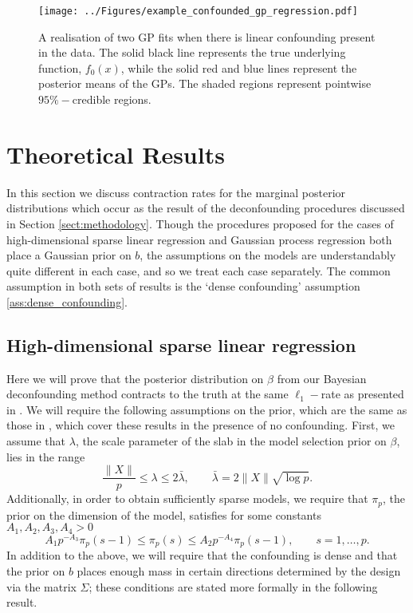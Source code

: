 \documentclass[11pt]{article}
\begin{document}
\begin{figure}[!h]
\centering
  \texttt{[image: ../Figures/example\_confounded\_gp\_regression.pdf]}\\
  \caption{A realisation of two GP fits when there is linear confounding present in the data. The solid black line represents the true underlying function, $f_0(x)$, while the solid red and blue lines represent the posterior means of the GPs. The shaded regions represent pointwise $95\%-$credible regions.}
\label{fig:gp_lin_confounding}
\end{figure}






\section{Theoretical Results}\label{sect:theory}
In this section we discuss contraction rates for the marginal posterior distributions which occur as the result of the deconfounding procedures discussed in Section \ref{sect:methodology}. Though the procedures proposed for the cases of high-dimensional sparse linear regression and Gaussian process regression both place a Gaussian prior on $b$, the assumptions on the models are understandably quite different in each case, and so we treat each case separately. The common assumption in both sets of results is the `dense confounding' assumption \eqref{ass:dense_confounding}.

\subsection{High-dimensional sparse linear regression}
Here we will prove that the posterior distribution on $\beta$ from our Bayesian deconfounding method contracts to the truth at the same $\ell_1-$rate as presented in \cite{CBM2020}. We will require the following assumptions on the prior, which are the same as those in \cite{CS-HV2015}, which cover these results in the presence of no confounding. First, we assume that $\lambda$, the scale parameter of the slab in the model selection prior on $\beta$, lies in the range
\begin{equation}
	\frac{\|X\|}{p} \leq \lambda \leq 2\bar{\lambda}, \qquad \bar{\lambda} = 2\|X\|\sqrt{\log p}. \label{prior_assum_lambda}
\end{equation}
Additionally, in order to obtain sufficiently sparse models, we require that $\pi_p$, the prior on the dimension of the model, satisfies for some constants $A_1, A_2, A_3, A_4 > 0$
\begin{equation}
	A_1 p^{-A_3}\pi_p(s-1) \leq \pi_p(s) \leq A_2p^{-A_4} \pi_p(s-1), \qquad s = 1,\dots, p. \label{prior_assum_pi_p}
\end{equation}
In addition to the above, we will require that the confounding is dense and that the prior on $b$ places enough mass in certain directions determined by the design via the matrix $\Sigma$; these conditions are stated more formally in the following result.
\end{document}
